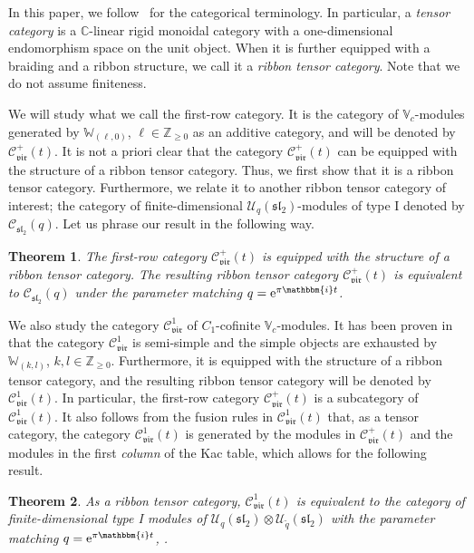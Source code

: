 \documentclass[pdftex]{sigma}
\numberwithin{equation}{section}
\newtheorem{thm}{Theorem}[section]
\newcommand{\bC}{\mathbb{C}}
\newcommand{\bZ}{\mathbb{Z}}
\newcommand{\cC}{\mathcal{C}}
\newcommand{\cU}{\mathcal{U}}
\newcommand{\fsl}{\mathfrak{sl}}
\newcommand{\bbmi}{\mathbbm{i}}
\newcommand{\UEA}{\cU}
\newcommand{\Uq}{\UEA_{q}}
\newcommand{\catQG}{\cC_{\fsl_{2}}}
\newcommand{\catVir}{\cC_{\vir}}
\newcommand{\virvoa}{\mathbb{V}}
\newcommand{\virmod}{\mathbb{W}}
\newcommand{\vir}{\mathfrak{vir}}
\begin{document}
In this paper, we follow~\cite{etingof2015tensor} for the categorical terminology.
In particular, a {\it tensor category} is a $\bC$-linear rigid monoidal category
with a one-dimensional endomorphism space on the unit object.
When it is further equipped with a braiding and a ribbon structure, we call it a {\it ribbon tensor category}.
Note that we do not assume finiteness.

We will study what we call the first-row category.
It is the category of $\virvoa_{c}$-modules generated by $\virmod_{(\ell,0)}$, $\ell \in\bZ_{\geq 0}$ as an additive category,
and will be denoted by $\catVir^{+}(t)$.
It is not a priori clear that the category $\catVir^{+}(t)$ can be equipped with the structure of a ribbon tensor category.
Thus, we first show that it is a ribbon tensor category.
Furthermore, we relate it to another ribbon tensor category of interest;
the category of finite-dimensional $\Uq(\fsl_{2})$-modules of type I denoted by $\catQG (q)$.
Let us phrase our result in the following way.

\begin{thm}
\label{thm:first-row-cat_QG}
The first-row category $\catVir^{+}(t)$ is equipped with the structure of a ribbon tensor category.
The resulting ribbon tensor category $\catVir^{+}(t)$ is equivalent to $\catQG(q)$
under the parameter matching $q = {\rm e}^{\pi \bbmi t}$.
\end{thm}

We also study the category $\catVir^{1}$ of $C_{1}$-cofinite $\virvoa_{c}$-modules.
It has been proven in~\cite{CJORY-tensor_categories_arising_from_Virasoro_algebra} that the category $\catVir^{1}$ is semi-simple and the simple objects are exhausted by $\virmod_{(k,l)}$, $k,l \in\bZ_{\geq 0}$.
Furthermore, it is equipped with the structure of a ribbon tensor category,
and the resulting ribbon tensor category will be denoted by $\catVir^{1}(t)$.
In particular, the first-row category $\catVir^{+}(t)$ is a subcategory of $\catVir^{1}(t)$.
It also follows from the fusion rules in $\catVir^{1}(t)$ that, as a tensor category,
the category $\catVir^{1}(t)$ is generated by the modules in $\catVir^{+}(t)$ and the modules in the first {\it column} of the Kac table,
which allows for the following result.

\begin{thm}
\label{thm:C1-cat_QG}
As a ribbon tensor category, $\catVir^{1}(t)$ is equivalent to the category of finite-dimensional type I modules of $\Uq (\fsl_{2})\otimes \cU_{\tilde{q}}(\fsl_{2})$ with the parameter matching $q = {\rm e}^{\pi\bbmi t}$, \smash{$\tilde{q} = {\rm e}^{\pi \bbmi t^{-1}}$}.
\end{thm}
\end{document}
